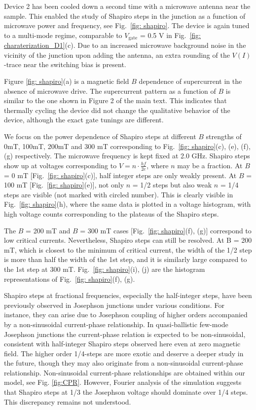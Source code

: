 Device 2 has been cooled down a second time with a microwave antenna near the sample. 
This enabled the study of Shapiro steps in the junction as a function of microwave power and frequency, see Fig.~\ref{fig: shapiro}.
The device is again tuned to a multi-mode regime, comparable to $V_\mathrm{gate}$ = 0.5 V in Fig.~\ref{fig: charaterization_D1}(c). 
Due to an increased microwave background noise in the vicinity of the junction upon adding the antenna, an extra rounding of the $V\left(I\right)$-trace near the switching bias is present. 

Figure \ref{fig: shapiro}(a) is a magnetic field $B$ dependence of supercurrent in the absence of microwave drive. 
The supercurrent pattern as a function of $B$ is similar to the one shown in Figure 2 of the main text. 
This indicates that thermally cycling the device did not change the qualitative behavior of the device, although the exact gate tunings are different. 

We focus on the power dependence of Shapiro steps at different $B$ strengths of 0mT, 100mT, 200mT and 300 mT corresponding to Fig.~\ref{fig: shapiro}(c), (e), (f), (g) respectively. 
The microwave frequency is kept fixed at 2.0 GHz. Shapiro steps show up at voltages corresponding to $V=n\cdot\frac{hf}{2e}$, where $n$ may be a fraction. At $B$ = 0 mT [Fig.~\ref{fig: shapiro}(c)], half integer steps are only weakly present. 
At $B$ = 100 mT [Fig.~\ref{fig: shapiro}(e)], not only $n$ = 1/2 steps but also weak $n$ = 1/4 steps are visible (not marked with circled number). 
This is clearly visible in Fig.~\ref{fig: shapiro}(h), where the same data is plotted in a voltage histogram, with high voltage counts corresponding to the plateaus of the Shapiro steps.

The $B$ = 200 mT and $B$ = 300 mT cases [Fig.~\ref{fig: shapiro}(f), (g)] correspond to low critical currents. Nevertheless, Shapiro steps can still be resolved. At B = 200 mT, which is closest to the minimum of critical current, the width of the 1/2 step is more than half the width of the 1st step, and it is similarly large compared to the 1st step at 300 mT. Fig.~\ref{fig: shapiro}(i), (j) are the histogram representations of Fig.~\ref{fig: shapiro}(f), (g).

Shapiro steps at fractional frequencies, especially the half-integer steps, have been previously observed in Josephson junctions under various conditions\cite{Lehnert1999,Dubos2001, DinsmoreIII2008,Sellier2004,Chauvin2006}. 
For instance, they can arise due to Josephson coupling of higher orders accompanied by a non-sinusoidal current-phase relationship\cite{Radovifmmodecuteclseci2001}. 
In quasi-ballistic few-mode Josephson junctions the current-phase relation is expected to be non-sinusoidal, consistent with half-integer Shapiro steps observed here even at zero magnetic field. 
The higher order 1/4-steps are more exotic and deserve a deeper study in the future, though they may also originate from a non-sinusoidal current-phase relationship. 
Non-sinusoidal current-phase relationships are obtained within our model, see Fig. \ref{fig:CPR}. However, Fourier analysis of the simulation suggests that Shapiro steps at 1/3 the Josephson voltage should dominate over 1/4 steps. This discrepancy remains not understood.

